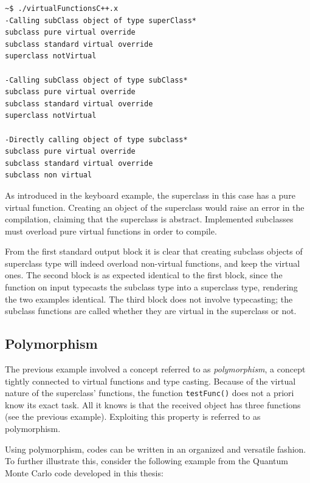 \begin{verbatim}
~$ ./virtualFunctionsC++.x 
-Calling subClass object of type superClass*
subclass pure virtual override
subclass standard virtual override
superclass notVirtual

-Calling subClass object of type subClass*
subclass pure virtual override
subclass standard virtual override
superclass notVirtual

-Directly calling object of type subclass*
subclass pure virtual override
subclass standard virtual override
subclass non virtual
\end{verbatim}

As introduced in the keyboard example, the superclass in this case has a pure virtual function. Creating an object of the superclass would raise an error in the compilation, claiming that the superclass is abstract. Implemented subclasses must overload pure virtual functions in order to compile.

From the first standard output block it is clear that creating subclass objects of superclass type will indeed overload non-virtual functions, and keep the virtual ones. The second block is as expected identical to the first block, since the function on input typecasts the subclass type into a superclass type, rendering the two examples identical. The third block does not involve typecasting; the subclass functions are called whether they are virtual in the superclass or not.


\subsection{Polymorphism}
\label{sec:typeCastPoly}

The previous example involved a concept referred to as \textit{polymorphism}, a concept tightly connected to virtual functions and type casting. Because of the virtual nature of the superclass' functions, the function \verb+testFunc()+ does not a priori know its exact task. All it knows is that the received object has three functions (see the previous example). Exploiting this property is referred to as polymorphism.

Using polymorphism, codes can be written in an organized and versatile fashion. To further illustrate this, consider the following example from the Quantum Monte Carlo code developed in this thesis:

